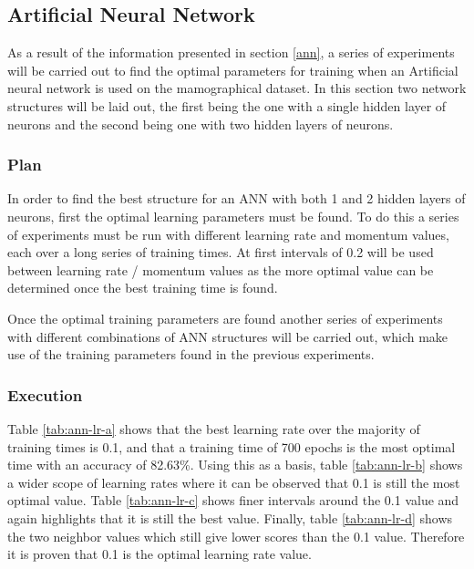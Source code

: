 \documentclass[12pt]{article}
\begin{document}
  \subsection{Artificial Neural Network}
    As a result of the information presented in section \ref{ann}, a series of experiments will be carried out to find the optimal parameters for training when an Artificial neural network is used on the mamographical dataset. In this section two network structures will be laid out, the first being the one with a single hidden layer of neurons and the second being one with two hidden layers of neurons.

    \subsubsection{Plan}
      In order to find the best structure for an ANN with both 1 and 2 hidden layers of neurons, first the optimal learning parameters must be found. To do this a series of experiments must be run with different learning rate and momentum values, each over a long series of training times. At first intervals of 0.2 will be used between learning rate / momentum values as the more optimal value can be determined once the best training time is found.

      Once the optimal training parameters are found another series of experiments with different combinations of ANN structures will be carried out, which make use of the training parameters found in the previous experiments.

    \subsubsection{Execution} \label{ann-ex}
      Table \ref{tab:ann-lr-a} shows that the best learning rate over the majority of training times is 0.1, and that a training time of 700 epochs is the most optimal time with an accuracy of 82.63\%. Using this as a basis, table \ref{tab:ann-lr-b} shows a wider scope of learning rates where it can be observed that 0.1 is still the most optimal value. Table \ref{tab:ann-lr-c} shows finer intervals around the 0.1 value and again highlights that it is still the best value. Finally, table \ref{tab:ann-lr-d} shows the two neighbor values which still give lower scores than the 0.1 value. Therefore it is proven that 0.1 is the optimal learning rate value.
\end{document}
